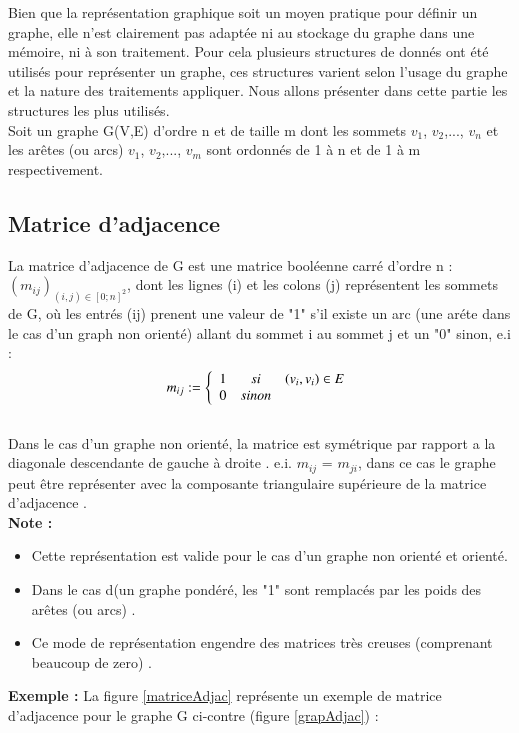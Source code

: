Bien que la représentation graphique soit un moyen pratique pour définir un graphe, elle n’est clairement pas adaptée ni au stockage du graphe dans une mémoire, ni à son traitement. Pour cela plusieurs structures de donnés ont été utilisés pour représenter un graphe, ces structures varient selon l’usage du graphe et la nature des traitements appliquer. Nous allons présenter dans cette partie les structures les plus utilisés.
\\Soit un graphe G(V,E) d’ordre n et de taille m dont les sommets $\textit{v}_{1}$, $\textit{v}_{2}$,..., $\textit{v}_{n}$ et les arêtes (ou arcs) $\textit{v}_{1}$, $\textit{v}_{2}$,..., $\textit{v}_{m}$ sont ordonnés de 1 à n et de 1 à m respectivement.
		
		

		
			\subsection{Matrice d'adjacence}
			
				La matrice d’adjacence de G est une matrice booléenne 					carré d’ordre n : ${({m}_{ij})}_{(i,j) \in {[0;n]}^{2}}$,  dont les 					lignes (i) et les colons (j)  représentent les sommets de G, 			où les entrés (ij) prenent une valeur de "1" s’il existe un 				arc (une aréte dans le cas d'un graph non orienté) allant du 			sommet i au sommet j et un "0" sinon, e.i \citep{lehman2010mathematics} \citep{mathieu} \citep{IUTLyonInformatique} :
			\[{m}_{ij} :=
			\left\{
			\begin{array}{r c l}
			1 & si & (\textit{v}_{i} , \textit{v}_{i}) \in E \\
			0 & sinon
			\end{array}
			\right.
			\]
			\\
			Dans le cas d’un graphe non orienté, la matrice est 						symétrique par rapport a la diagonale descendante de gauche	 			à droite . e.i. ${m}_{ij}$ = ${m}_{ji}$, dans ce cas le 						graphe peut être représenter avec  la composante 							triangulaire supérieure de la matrice d'adjacence \citep{muller}.\\
			\textbf{Note :} \begin{itemize} 
			\item Cette représentation est valide pour le cas 					d'un graphe non orienté et orienté.
			\item Dans le cas d(un graphe pondéré, les "1" sont remplacés par les poids des arêtes (ou arcs) \citep{lopez2003cours}.
			\item Ce mode de représentation engendre des matrices très creuses (comprenant beaucoup de zero) \citep{hennecart2012elements}. 
			\end{itemize}
			\textbf{Exemple :} La figure \ref{matriceAdjac} représente 					un exemple de matrice d'adjacence pour le graphe G ci-contre 			(figure \ref{grapAdjac}) :
			
